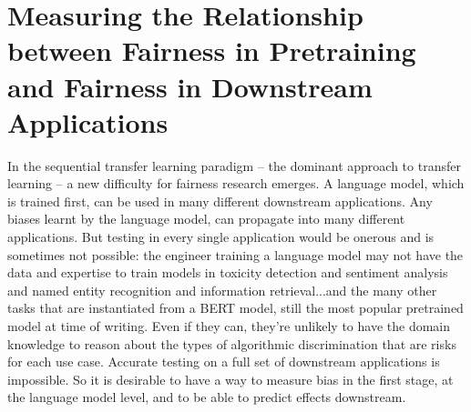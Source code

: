 \part{Measuring the Relationship between Fairness in Pretraining and Fairness in Downstream Applications}
\label{part:measurement}

In the sequential transfer learning paradigm -- the dominant approach to transfer learning --  a new difficulty for fairness research emerges. A language model, which is trained first, can be used in many different downstream applications. Any biases learnt by the language model, can propagate into many different applications. But testing in every single application would be onerous and is sometimes not possible: the engineer training a language model may not have the data and expertise to train models in toxicity detection and sentiment analysis and named entity recognition and information retrieval...and the many other tasks that are instantiated from a BERT model, still the most popular pretrained model at time of writing. 
Even if they can, they're unlikely to have the domain knowledge to reason about the types of algorithmic discrimination that are risks for each use case.
Accurate testing on a full set of downstream applications is impossible. So it is desirable to have a way to measure bias in the first stage, at the language model level, and to be able to predict effects downstream.


